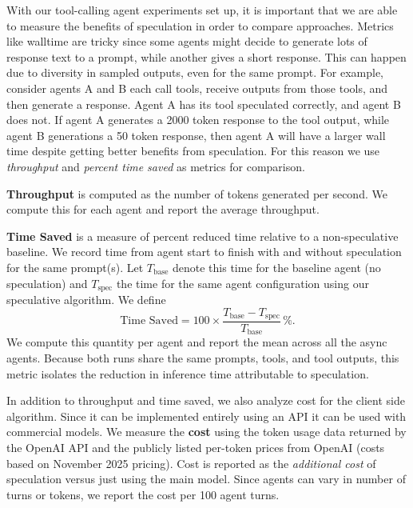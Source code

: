 With our tool-calling agent experiments set up, it is important that we are able to measure the benefits of speculation in order to compare approaches.
Metrics like walltime are tricky since some agents might decide to generate lots of response text to a prompt, while another gives a short response. This can happen due to diversity in sampled outputs, even for the same prompt.
For example, consider agents A and B each call tools, receive outputs from those tools, and then generate a response. 
Agent A has its tool speculated correctly, and agent B does not.
If agent A generates a 2000 token response to the tool output, while agent B generations a 50 token response, then agent A will have a larger wall time despite getting better benefits from speculation.
For this reason we use \emph{throughput} and \emph{percent time saved} as metrics for comparison.

\vspace{0.7em}
\noindent\textbf{Throughput} is computed as the number of tokens generated per second. We compute this for each agent and report the average throughput.

\vspace{0.7em}
\noindent\textbf{Time Saved} is a measure of percent reduced time relative to a non-speculative baseline. We record time from agent start to finish with and without speculation for the same prompt(s). Let $T_{\text{base}}$ denote this time for the baseline agent (no speculation) and $T_{\text{spec}}$ the time for the same agent configuration using our speculative algorithm. We define
\[
\text{Time Saved} = 100 \times \frac{T_{\text{base}} - T_{\text{spec}}}{T_{\text{base}}} \,\%.
\]
We compute this quantity per agent and report the mean across all the async agents. Because both runs share the same prompts, tools, and tool outputs, this metric isolates the reduction in inference time attributable to speculation.

In addition to throughput and time saved, we also analyze cost for the client side algorithm.
Since it can be implemented entirely using an API it can be used with commercial models.
We measure the \textbf{cost} using the token usage data returned by the OpenAI API and the publicly listed per-token prices from OpenAI (costs based on November 2025 pricing).
Cost is reported as the \emph{additional cost} of speculation versus just using the main model.
Since agents can vary in number of turns or tokens, we report the cost per 100 agent turns.
